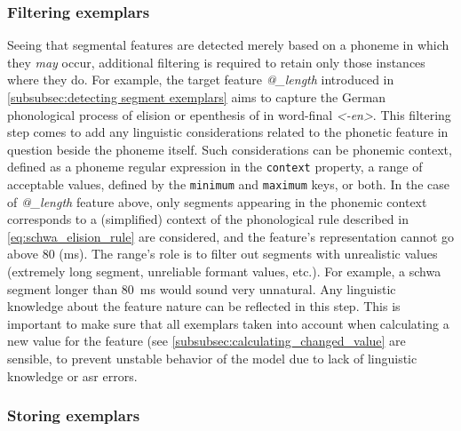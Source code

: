 \subsubsection{Filtering exemplars}
\label{subsubsec:filtering_exemplars}

Seeing that segmental features are detected merely based on a phoneme in which they \emph{may} occur, additional filtering is required to retain only those instances where they do.
For example, the target feature \textit{@\_length} introduced in \cref{subsubsec:detecting segment exemplars} aims to capture the German phonological process of elision or epenthesis of  in word-final \textit{<-en>}.
%
%
%
This filtering step comes to add any linguistic considerations related to the phonetic feature in question beside the phoneme itself.
Such considerations can be phonemic context, defined as a phoneme regular expression in the \texttt{context} property, a range of acceptable values, defined by the \texttt{minimum} and \texttt{maximum} keys, or both.
In the case of \textit{@\_length} feature above, only segments appearing in the phonemic context corresponds to a (simplified) context of the phonological rule described in \cref{eq:schwa_elision_rule} are considered, and the feature's representation cannot go above 80 (\si{\milli\second}).
The range's role is to filter out segments with unrealistic values (extremely long segment, unreliable formant values, etc.).
For example, a schwa segment longer than \SI{80}{\milli\second} would sound very unnatural.
Any linguistic knowledge about the feature nature can be reflected in this step.
This is important to make sure that all exemplars taken into account when calculating a new value for the feature (see \cref{subsubsec:calculating_changed_value} are sensible, to prevent unstable behavior of the model due to lack of linguistic knowledge or \ac{asr} errors.

\subsubsection{Storing exemplars}
\label{subsubsec:collecting_exemplars}

